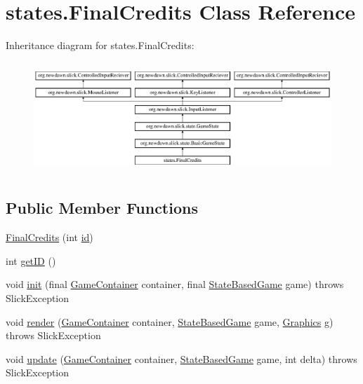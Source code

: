 \hypertarget{classstates_1_1_final_credits}{}\section{states.\+Final\+Credits Class Reference}
\label{classstates_1_1_final_credits}
Inheritance diagram for states.\+Final\+Credits\+:\begin{figure}[H]
\begin{center}
\leavevmode
\includegraphics[height=4.226415cm]{classstates_1_1_final_credits}
\end{center}
\end{figure}
\subsection*{Public Member Functions}
\begin{DoxyCompactItemize}
\item 
\mbox{\hyperlink{classstates_1_1_final_credits_a2696358b5ac79f9385759c4a217b0bd0}{Final\+Credits}} (int \mbox{\hyperlink{classstates_1_1_final_credits_afdc1fee5ede57fa6fcc6d70025a0b7c5}{id}})
\item 
int \mbox{\hyperlink{classstates_1_1_final_credits_aa078f93a7bd5ae2194d959f8dded659f}{get\+ID}} ()
\item 
void \mbox{\hyperlink{classstates_1_1_final_credits_acb91cf3998cc530727fb2ca5926c57b1}{init}} (final \mbox{\hyperlink{classorg_1_1newdawn_1_1slick_1_1_game_container}{Game\+Container}} container, final \mbox{\hyperlink{classorg_1_1newdawn_1_1slick_1_1state_1_1_state_based_game}{State\+Based\+Game}} game)  throws Slick\+Exception 
\item 
void \mbox{\hyperlink{classstates_1_1_final_credits_a48f6a5fefe171870bf0d8419f15b791d}{render}} (\mbox{\hyperlink{classorg_1_1newdawn_1_1slick_1_1_game_container}{Game\+Container}} container, \mbox{\hyperlink{classorg_1_1newdawn_1_1slick_1_1state_1_1_state_based_game}{State\+Based\+Game}} game, \mbox{\hyperlink{classorg_1_1newdawn_1_1slick_1_1_graphics}{Graphics}} g)  throws Slick\+Exception 
\item 
void \mbox{\hyperlink{classstates_1_1_final_credits_a4a374cbcb25a79fa9f8590d2c2653df3}{update}} (\mbox{\hyperlink{classorg_1_1newdawn_1_1slick_1_1_game_container}{Game\+Container}} container, \mbox{\hyperlink{classorg_1_1newdawn_1_1slick_1_1state_1_1_state_based_game}{State\+Based\+Game}} game, int delta)  throws Slick\+Exception 
\end{DoxyCompactItemize}
